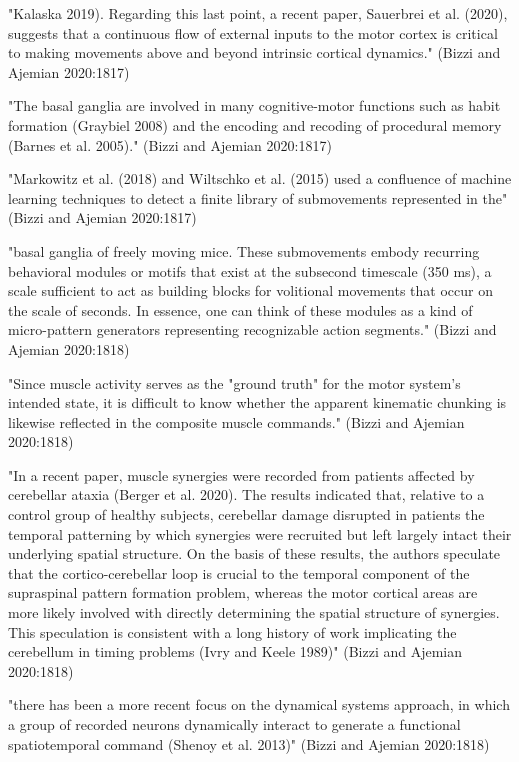 \documentclass[../main.tex]{subfiles}
\begin{document}
{{"Kalaska 2019). Regarding this last point, a recent paper, Sauerbrei et al. (2020), suggests that a continuous flow of external inputs to the motor cortex is critical to making movements above and beyond intrinsic cortical dynamics." (Bizzi and Ajemian 2020:1817)

"The basal ganglia are involved in many cognitive-motor functions such as habit formation (Graybiel 2008) and the encoding and recoding of procedural memory (Barnes et al. 2005)." (Bizzi and Ajemian 2020:1817)

"Markowitz et al. (2018) and Wiltschko et al. (2015) used a confluence of machine learning techniques to detect a finite library of submovements represented in the" (Bizzi and Ajemian 2020:1817)

"basal ganglia of freely moving mice. These submovements embody recurring behavioral modules or motifs that exist at the subsecond timescale (350 ms), a scale sufficient to act as building blocks for volitional movements that occur on the scale of seconds. In essence, one can think of these modules as a kind of micro-pattern generators representing recognizable action segments." (Bizzi and Ajemian 2020:1818)

"Since muscle activity serves as the "ground truth" for the motor system's intended state, it is difficult to know whether the apparent kinematic chunking is likewise reflected in the composite muscle commands." (Bizzi and Ajemian 2020:1818)

"In a recent paper, muscle synergies were recorded from patients affected by cerebellar ataxia (Berger et al. 2020). The results indicated that, relative to a control group of healthy subjects, cerebellar damage disrupted in patients the temporal patterning by which synergies were recruited but left largely intact their underlying spatial structure. On the basis of these results, the authors speculate that the cortico-cerebellar loop is crucial to the temporal component of the supraspinal pattern formation problem, whereas the motor cortical areas are more likely involved with directly determining the spatial structure of synergies. This speculation is consistent with a long history of work implicating the cerebellum in timing problems (Ivry and Keele 1989)" (Bizzi and Ajemian 2020:1818)

"there has been a more recent focus on the dynamical systems approach, in which a group of recorded neurons dynamically interact to generate a functional spatiotemporal command (Shenoy et al. 2013)" (Bizzi and Ajemian 2020:1818)

}}
\end{document}
